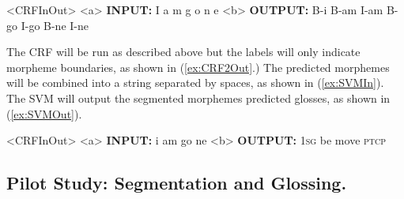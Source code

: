 \begin{singlespace}
\pex<CRFInOut>   
\label{ex:CRF2InOut}
\a<a> \textbf{INPUT:} \hspace{8 mm} I \hspace{7 mm} a \hspace{7 mm} m \hspace{7 mm} g \hspace{6 mm} o \hspace{6 mm} n \hspace{6 mm} e 
\label{ex:CRF2in}
\a<b> \textbf{OUTPUT:} \hspace{2 mm} B-i \hspace{1 mm} B-am \hspace{1 mm} I-am \hspace{1 mm} B-go \hspace{1 mm} I-go \hspace{1 mm} B-ne \hspace{1 mm} I-ne
\label{ex:CRF2Out}
\xe
\end{singlespace}

The CRF will be run as described above but the labels will only indicate morpheme boundaries, as shown in (\ref{ex:CRF2Out}.) The predicted morphemes will be combined into a string separated by spaces, as shown in (\ref{ex:SVMIn}). The SVM will output the segmented morphemes predicted glosses, as shown in (\ref{ex:SVMOut}). 

\begin{singlespace}
\pex<CRFInOut>   
\label{ex:SVMInOut}
\a<a> \textbf{INPUT:} \hspace{7 mm} i \hspace{4 mm} am \hspace{2 mm} go \hspace{5 mm} ne 
\label{ex:SVMIn}
\a<b> \textbf{OUTPUT:} \hspace{1 mm} 1\textsc{sg} \hspace{1 mm} be \hspace{1 mm} move \hspace{1 mm} \textsc{ptcp}
\label{ex:SVMOut}
\xe
\end{singlespace}


\subsection{Pilot Study: Segmentation and Glossing.}
\label{sec:pilotseggls}

